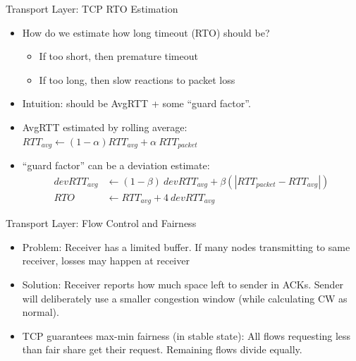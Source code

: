 \documentclass{beamer}
\begin{document}
\begin{frame}[t]{Transport Layer: TCP RTO Estimation}
    \begin{itemize}
        \item How do we estimate how long timeout (RTO) should be?
        \begin{itemize}
            \item \pause If too short, then premature timeout
            \item If too long, then slow reactions to packet loss
        \end{itemize}
        \item \pause \alert{Intuition}: should be AvgRTT + some ``guard factor''.
        \item \pause AvgRTT estimated by rolling average: $RTT_{avg} \gets (1-\alpha) RTT_{avg} + \alpha\> RTT_{packet}$
        \item \pause ``guard factor'' can be a deviation estimate: \begin{align*}
            devRTT_{avg} &\gets (1-\beta)\> devRTT_{avg} + \beta (|RTT_{packet} - RTT_{avg}|)\\
            RTO &\gets RTT_{avg} + 4\>devRTT_{avg}
        \end{align*}
    \end{itemize}
\end{frame}

\begin{frame}[t]{Transport Layer: Flow Control and Fairness}
    \begin{itemize}
        \item \alert{Problem}: Receiver has a limited buffer. If many nodes transmitting to same receiver, losses may happen at receiver
        \item \pause \alert{Solution}: Receiver reports how much space left to sender in ACKs. Sender will deliberately use a smaller congestion window (while calculating CW as normal).
        \vspace{1cm}
        \item \pause TCP guarantees \alert{max-min fairness} (in stable state): All flows requesting less than fair share get their request. Remaining flows divide equally.
    \end{itemize}
\end{frame}
\end{document}
